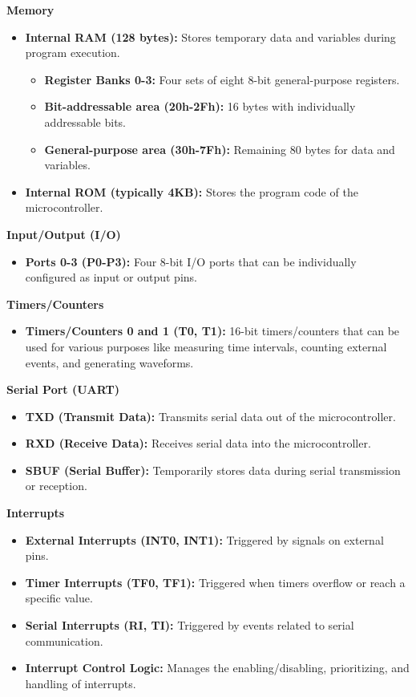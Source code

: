 \documentclass[
]{article}
\begin{document}
\textbf{Memory}

\begin{itemize}
\item
  \textbf{Internal RAM (128 bytes):} Stores temporary data and variables
  during program execution.

  \begin{itemize}
  \item
    \textbf{Register Banks 0-3:} Four sets of eight 8-bit
    general-purpose registers.
  \item
    \textbf{Bit-addressable area (20h-2Fh):} 16 bytes with individually
    addressable bits.
  \item
    \textbf{General-purpose area (30h-7Fh):} Remaining 80 bytes for data
    and variables.
  \end{itemize}
\item
  \textbf{Internal ROM (typically 4KB):} Stores the program code of the
  microcontroller.
\end{itemize}

\textbf{Input/Output (I/O)}

\begin{itemize}
\item
  \textbf{Ports 0-3 (P0-P3):} Four 8-bit I/O ports that can be
  individually configured as input or output pins.
\end{itemize}

\textbf{Timers/Counters}

\begin{itemize}
\item
  \textbf{Timers/Counters 0 and 1 (T0, T1):} 16-bit timers/counters that
  can be used for various purposes like measuring time intervals,
  counting external events, and generating waveforms.
\end{itemize}

\textbf{Serial Port (UART)}

\begin{itemize}
\item
  \textbf{TXD (Transmit Data):} Transmits serial data out of the
  microcontroller.
\item
  \textbf{RXD (Receive Data):} Receives serial data into the
  microcontroller.
\item
  \textbf{SBUF (Serial Buffer):} Temporarily stores data during serial
  transmission or reception.
\end{itemize}

\textbf{Interrupts}

\begin{itemize}
\item
  \textbf{External Interrupts (INT0, INT1):} Triggered by signals on
  external pins.
\item
  \textbf{Timer Interrupts (TF0, TF1):} Triggered when timers overflow
  or reach a specific value.
\item
  \textbf{Serial Interrupts (RI, TI):} Triggered by events related to
  serial communication.
\item
  \textbf{Interrupt Control Logic:} Manages the enabling/disabling,
  prioritizing, and handling of interrupts.
\end{itemize}
\end{document}
